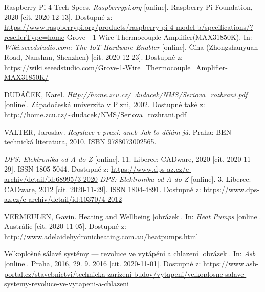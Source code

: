\begin{thebibliography}{3}
Raspberry Pi 4 Tech Specs. \textit{Raspberrypi.org} [online]. Raspberry Pi Foundation, 2020 [cit. 2020-12-13]. Dostupné z: \url{https://www.raspberrypi.org/products/raspberry-pi-4-model-b/specifications/?resellerType=home}
Grove - 1-Wire Thermocouple Amplifier(MAX31850K). In: \textit{Wiki.seeedstudio.com: The IoT Hardware Enabler} [online]. Čína (Zhongshanyuan Road, Nanshan, Shenzhen) [cit. 2020-12-23]. Dostupné z: \url{ https://wiki.seeedstudio.com/Grove-1-Wire\_Thermocouple\_Amplifier-MAX31850K/}


DUDÁČEK, Karel. \textit{Http://home.zcu.cz/~dudacek/NMS/Seriova\_rozhrani.pdf} [online]. Západočeská univerzita v Plzni, 2002. Dostupné také z: \url{http://home.zcu.cz/~dudacek/NMS/Seriova\_rozhrani.pdf}


VALTER, Jaroslav. \textit{Regulace v praxi: aneb Jak to dělám já}. Praha: BEN --- technická literatura, 2010. ISBN 9788073002565.

\textit{DPS: Elektronika od A do Z} [online]. 11. Liberec: CADware, 2020 [cit. 2020-11-29]. ISSN 1805-5044. Dostupné z: \url{https://www.dps-az.cz/e-archiv/detail/id:68995/3-2020}
\textit{DPS: Elektronika od A do Z} [online]. 3. Liberec: CADware, 2012 [cit. 2020-11-29]. ISSN 1804-4891. Dostupné z: \url{https://www.dps-az.cz/e-archiv/detail/id:10370/4-2012}


VERMEULEN, Gavin. Heating and Wellbeing [obrázek]. In: \textit{Heat Pumps} [online]. Austrálie [cit. 2020-11-05]. Dostupné z: \url{http://www.adelaidehydronicheating.com.au/heatpumps.html}

Velkoplošné sálavé systémy --- revoluce ve vytápění a chlazení [obrázek]. In: \textit{Asb} [online]. Praha, 2016, 29. 9. 2016 [cit. 2020-11-01]. Dostupné z: \url{https://www.asb-portal.cz/stavebnictvi/technicka-zarizeni-budov/vytapeni/velkoplosne-salave-systemy-revoluce-ve-vytapeni-a-chlazeni}


\end{thebibliography}
